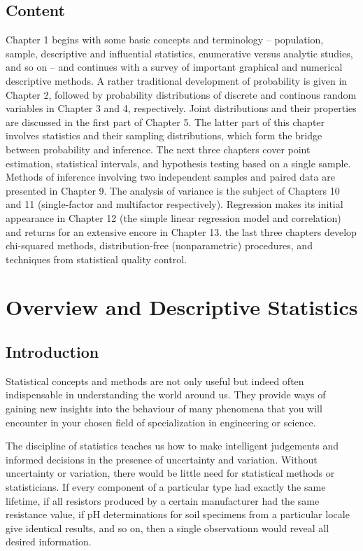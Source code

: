\documentclass[]{book}
\begin{document}
\section*{Content}
Chapter 1 begins with some basic concepts and terminology -- population, sample, descriptive and influential statistics, enumerative versus analytic studies, and so on -- and continues with a survey of important graphical and numerical descriptive methods. A rather traditional development of probability is given in Chapter 2, followed by probability distributions of discrete and continous random variables in Chapter 3 and 4, respectively. Joint distributions and their properties are discussed in the first part of Chapter 5. The latter part of this chapter involves statistics and their sampling distributions, which form the bridge between probability and inference. The next three chapters cover point estimation, statistical intervals, and hypothesis testing based on a single sample. Methods of inference involving two independent samples and paired data are presented in Chapter 9. The analysis of variance is the subject of Chapters 10 and 11 (single-factor and multifactor respectively). Regression makes its initial appearance in Chapter 12 (the simple linear regression model and correlation) and returns for an extensive encore in Chapter 13. the last three chapters develop chi-squared methods, distribution-free (nonparametric) procedures, and techniques from statistical quality control.


\chapter{Overview and Descriptive Statistics}
\section*{Introduction}
Statistical concepts and methods are not only useful but indeed often indispensable in understanding the world around us. They provide ways of gaining new insights into the behaviour of many phenomena that you will encounter in your chosen field of specialization in engineering or science.

The discipline of statistics teaches us how to make intelligent judgements and informed decisions in the presence of uncertainty and variation. Without uncertainty or variation, there would be little need for statistical methods or statisticians. If every component of a particular type had exactly the same lifetime, if all resistors produced by a certain manufacturer had the same resistance value, if pH determinations for soil specimens from a particular locale give identical results, and so on, then a single observationn would reveal all desired information.
\end{document}
